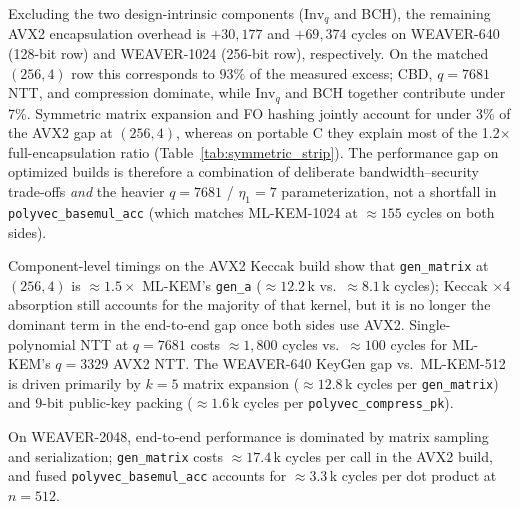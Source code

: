 Excluding the two design-intrinsic components ($\mathrm{Inv}_q$ and BCH), the
remaining AVX2 encapsulation overhead is $+30{,}177$ and $+69{,}374$ cycles on
\textsc{WEAVER-640} (128-bit row) and \textsc{WEAVER-1024} (256-bit row),
respectively.
On the matched $(256,4)$ row this corresponds to $93\%$ of the measured excess;
CBD, $q{=}7681$ NTT, and compression dominate, while $\mathrm{Inv}_q$
and BCH together contribute under 7\%.
Symmetric matrix expansion and FO hashing jointly account for under 3\% of the
AVX2 gap at $(256,4)$, whereas on portable C they explain most of the
1.2$\times$ full-encapsulation ratio (Table~\ref{tab:symmetric_strip}).
The performance gap on optimized builds is therefore a combination of deliberate
bandwidth--security trade-offs \emph{and} the heavier $q{=}7681$ / $\eta_1{=}7$
parameterization, not a shortfall in \texttt{polyvec\_basemul\_acc} (which matches
ML-KEM-1024 at $\approx{}155$ cycles on both sides).

Component-level timings on the AVX2 Keccak build show that
\texttt{gen\_matrix} at $(256,4)$ is $\approx{}1.5\times$ ML-KEM's
\texttt{gen\_a} ($\approx{}12.2$\,k vs.\ $\approx{}8.1$\,k cycles); Keccak
$\times$4 absorption still accounts for the majority of that kernel, but it is
no longer the dominant term in the end-to-end gap once both sides use AVX2.
Single-polynomial NTT at $q{=}7681$ costs $\approx{}1{,}800$ cycles vs.\
$\approx{}100$ cycles for ML-KEM's $q{=}3329$ AVX2 NTT.
The \textsc{WEAVER-640} KeyGen gap vs.\ ML-KEM-512 is driven primarily by
$k{=}5$ matrix expansion ($\approx{}12.8$\,k cycles per \texttt{gen\_matrix})
and 9-bit public-key packing ($\approx{}1.6$\,k cycles per
\texttt{polyvec\_compress\_pk}).

On \textsc{WEAVER-2048}, end-to-end performance is dominated by matrix sampling
and serialization; \texttt{gen\_matrix} costs $\approx{}17.4$\,k cycles per call
in the AVX2 build, and fused \texttt{polyvec\_basemul\_acc} accounts for
$\approx{}3.3$\,k cycles per dot product at $n{=}512$.

